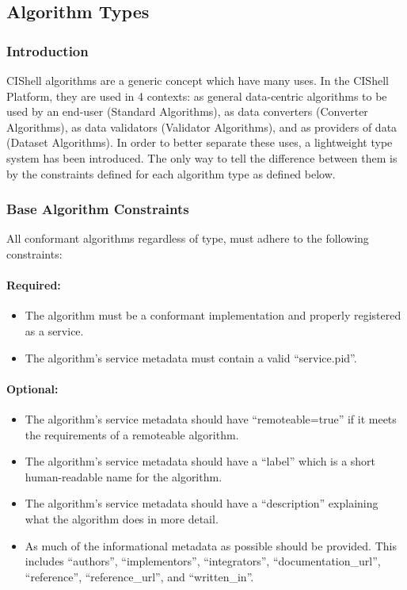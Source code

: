 \subsection{Algorithm Types}
\label{algConstraints}
\subsubsection{Introduction}

CIShell algorithms are a generic concept which have many uses. In the CIShell
Platform, they are used in 4 contexts: as general data-centric algorithms to be
used by an end-user (Standard Algorithms), as data converters (Converter
Algorithms), as data validators (Validator Algorithms), and as providers of data
(Dataset Algorithms). In order to better separate these uses, a lightweight type
system has been introduced. The only way to tell the difference between them is
by the constraints defined for each algorithm type as defined below.

\subsubsection{Base Algorithm Constraints}

All conformant algorithms regardless of type, must adhere to the following
constraints:

\paragraph*{Required:}
\begin{itemize}
  \item The algorithm must be a conformant 
  implementation and properly registered as a service.
  \item The algorithm's service metadata must contain a valid ``service.pid''.
\end{itemize}

\paragraph*{Optional:}
\begin{itemize}
  \item The algorithm's service metadata should have ``remoteable=true'' if it
  meets the requirements of a remoteable algorithm.
  \item The algorithm's service metadata should have a ``label'' which is a
  short human-readable name for the algorithm.
  \item The algorithm's service metadata should have a ``description''
  explaining what the algorithm does in more detail.
  \item As much of the informational metadata as possible should be
  provided. This includes ``authors'', ``implementors'', ``integrators'',
  ``documentation\_url'', ``reference'', ``reference\_url'', and ``written\_in''.
\end{itemize}

